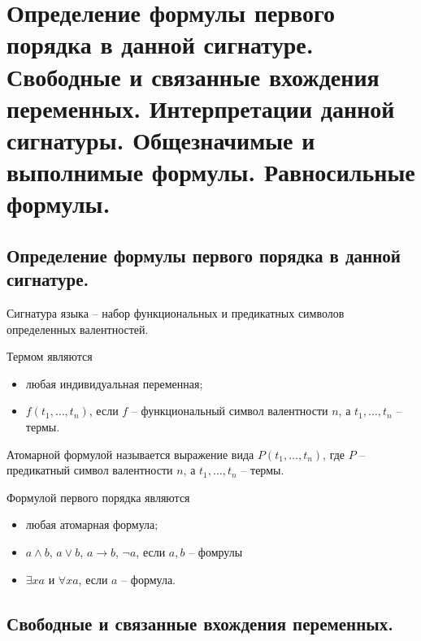 \section{Определение формулы первого порядка в данной сигнатуре. Свободные и связанные вхождения переменных. Интерпретации данной сигнатуры. Общезначимые и выполнимые формулы. Равносильные формулы.}

\subsection{Определение формулы первого порядка в данной сигнатуре.}

\begin{definition}
  Сигнатура языка -- набор функциональных и предикатных символов определенных валентностей.
\end{definition}

\begin{definition}
  Термом являются
  \begin{itemize}
    \item любая индивидуальная переменная;
    \item $f(t_1, \dots, t_n)$, если $f$ -- функциональный символ валентности $n$, а $t_1, \dots, t_n$ -- термы.
  \end{itemize}
\end{definition}

\begin{definition}
  Атомарной формулой называется выражение вида $P(t_1, \dots, t_n)$, где $P$ -- предикатный символ валентности $n$, а $t_1, \dots, t_n$ -- термы.
\end{definition}

\begin{definition}
  Формулой первого порядка являются
  \begin{itemize}
    \item любая атомарная формула;
    \item  $a \wedge b$, $a \vee b$, $a \to b$, $\neg a$, если $a,b$ -- фомрулы
    \item $\exists x a$ и $\forall x a$, если $a$ -- формула.
  \end{itemize}
\end{definition}

\subsection{Свободные и связанные вхождения переменных.}

